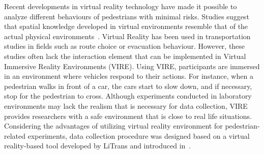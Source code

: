  Recent developments in virtual reality technology have made it possible to analyze different behaviours of pedestrians with minimal risks. Studies suggest that spatial knowledge developed in virtual environments resemble that of the actual physical environments~\cite{o1992effects,ruddle1997navigating}. Virtual Reality has been used in transportation studies in fields such as route choice or evacuation behaviour. However, these studies often lack the interaction element that can be implemented in Virtual Immersive Reality Environments (VIRE). Using VIRE, participants are immersed in an environment where vehicles respond to their actions. For instance, when a pedestrian walks in front of a car, the cars start to slow down, and if necessary, stop for the pedestrian to cross. Although experiments conducted in laboratory environments may lack the realism that is necessary for data collection, VIRE provides researchers with a safe environment that is close to real life situations. Considering the advantages of utilizing virtual reality environment for pedestrian-related experiments, data collection procedure was designed based on a virtual reality-based tool developed by LiTrans and introduced in~\cite{farooq2018virtual}. 
